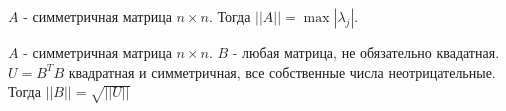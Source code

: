\documentclass[main]{subfiles}
\begin{document}
    \begin{proposition}
        $A$ - симметричная матрица $n \times n$. Тогда $||A|| = \max | \lambda_j |$.
    \end{proposition}
        \begin{theorem}
            $A$ - симметричная матрица $n \times n$. $B$ - любая матрица, не обязательно квадатная.
            $U = B^TB$ квадратная и симметричная, все собственные числа неотрицательные. Тогда
            $||B|| = \sqrt{||U||}$
        \end{theorem}
\end{document}
